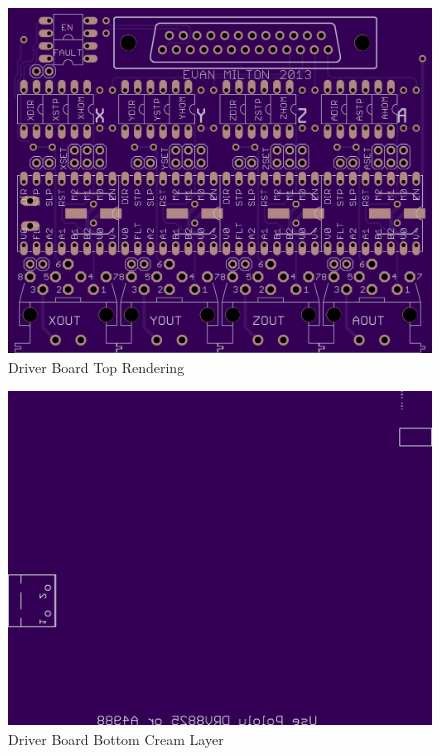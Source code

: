 \begin{figure}[h]
	\centering
	\includegraphics[width=1\textwidth]{pcb-design/dtoprender.png}
	\caption{Driver Board Top Rendering}
	\label{fig:driver-top-render}
\end{figure}
\begin{figure}[h]
	\centering
	\includegraphics[width=1\textwidth]{pcb-design/dbottomcream.png}
	\caption{Driver Board Bottom Cream Layer}
	\label{fig:driver-bottom-cream}
\end{figure}
